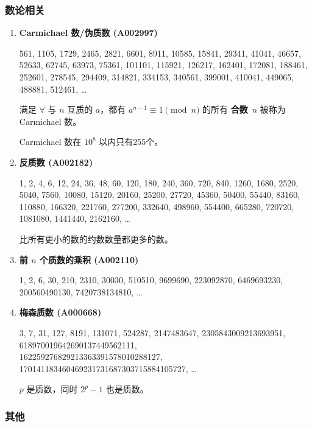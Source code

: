 \documentclass[a4paper, twoside]{article}
\begin{document}
    \subsubsection{数论相关}

    \begin{enumerate}
    
        \item \textbf{Carmichael 数/伪质数 (A002997)}
        
        561, 1105, 1729, 2465, 2821, 6601, 8911, 10585, 15841, 29341, 41041, 46657, 52633, 62745, 63973, 75361, 101101, 115921, 126217, 162401, 172081, 188461, 252601, 278545, 294409, 314821, 334153, 340561, 399001, 410041, 449065, 488881, 512461, \dots
        
        满足 $\forall$ 与 $n$ 互质的 $a$，都有 $a ^ {n - 1} \equiv 1 \pmod n$ 的所有 \textbf{合数}\ $n$ 被称为 Carmichael 数。
        
        Carmichael 数在 $10^8$ 以内只有255个。
        
        \item \textbf{反质数 (A002182)}
        
        1, 2, 4, 6, 12, 24, 36, 48, 60, 120, 180, 240, 360, 720, 840, 1260, 1680, 2520, 5040, 7560, 10080, 15120, 20160, 25200, 27720, 45360, 50400, 55440, 83160, 110880, 166320, 221760, 277200, 332640, 498960, 554400, 665280, 720720, 1081080, 1441440, 2162160, \dots
        
        比所有更小的数的约数数量都更多的数。
        
        \item \textbf{前 $n$ 个质数的乘积 (A002110)}
        
        1, 2, 6, 30, 210, 2310, 30030, 510510, 9699690, 223092870, 6469693230, 200560490130, 7420738134810, \dots
        
        \item \textbf{梅森质数 (A000668)}
        
        3, 7, 31, 127, 8191, 131071, 524287, 2147483647, 2305843009213693951, 618970019642690137449562111, \\
            162259276829213363391578010288127, 170141183460469231731687303715884105727, \dots
        
        $p$ 是质数，同时 $2^p - 1$ 也是质数。
    
    \end{enumerate}

    \subsubsection{其他}
\end{document}
